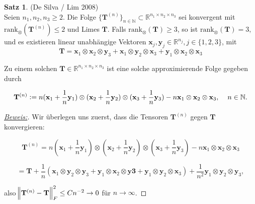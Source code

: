 \documentclass[11pt]{article} %
\theoremstyle{definition}
\newtheorem{thm}{Satz}[section]
\numberwithin{equation}{section}
\begin{document}
\begin{changemargin}{0pt}{0pt}
\begin{thm} (De Silva / Lim 2008) \cite{de_silva_lim}
\\Seien $n_{1},n_{2},n_{3} \geq 2$. Die Folge $\{\mathbf{T}^{(n)}\}_{n \in \mathbb{N}} \subset \mathbb{R}^{n_{1}\times n_{2} \times n_{3}}$
sei konvergent mit $\text{rank}_{\otimes}(\mathbf{T}^{(n)}) \leq 2$ und Limes $\mathbf{T}$. Falls $\text{rank}_{\otimes}(\mathbf{T}) \geq 3$, so ist
$\text{rank}_{\otimes}(\mathbf{T}) = 3,$ und es existieren linear unabhängige Vektoren $\mathbf{x}_{j},\mathbf{y}_{j} \in \mathbb{R}^{n_{j}}, j \in
 \{1,2,3\}$, mit
\[\mathbf{T} = \mathbf{x}_{1} \otimes \mathbf{x}_{2} \otimes \mathbf{y}_{3} + \mathbf{x}_{1} \otimes \mathbf{y}_{2} \otimes \mathbf{x}_{3}
+ \mathbf{y}_{1} \otimes \mathbf{x}_{2} \otimes \mathbf{x}_{3}\]

Zu einem solchen $\mathbf{T} \in \mathbb{R}^{n_{1}\times n_{2}\times n_{3}}$ ist eine solche approximierende Folge gegeben durch

\[ \mathbf{T}^{(n)} := n(\mathbf{x}_{1} + \frac{1}{n} \mathbf{y}_{1}) \otimes (\mathbf{x}_{2} + \frac{1}{n}\mathbf{y}_{2}) \otimes
 (\mathbf{x}_{3} + \frac{1}{n}\mathbf{y}_{3}) -n\mathbf{x}_{1}\otimes \mathbf{x}_{2} \otimes \mathbf{x}_{3},\hspace{4mm} n \in \mathbb{N}.\]
\end{thm}

\begin{proof}[\underline{Beweis:}\nopunct]
Wir überlegen uns zuerst, dass die Tensoren $\mathbf{T}^{(n)}$ gegen $\mathbf{T}$ konvergieren:

\[ \mathbf{T}^{(n)} =  n(\mathbf{x}_{1} + \frac{1}{n} \mathbf{y}_{1}) \otimes (\mathbf{x}_{2} + \frac{1}{n}\mathbf{y}_{2}) \otimes
 (\mathbf{x}_{3} + \frac{1}{n}\mathbf{y}_{3}) -n\mathbf{x}_{1}\otimes \mathbf{x}_{2} \otimes \mathbf{x}_{3} \]

\[= \mathbf{T} + \frac{1}{n}(\mathbf{x}_{1} \otimes \mathbf{y}_{2} \otimes \mathbf{y}_{3} + \mathbf{y}_{1} \otimes \mathbf{x}_{2}
 \otimes \mathbf{y3} + \mathbf{y}_{1} \otimes \mathbf{y}_{2} \otimes \mathbf{x}_{3}) + \frac{1}{n^{2}}\mathbf{y}_{1}\otimes \mathbf{y}_{2} \otimes
\mathbf{y}_{3}, \]

also $\norm{\mathbf{T}^{(n)} - \mathbf{T}}^{2}_{F} \leq Cn^{-2} \rightarrow 0$ für $n \rightarrow \infty$.


\end{proof}
\end{changemargin}
\end{document}
